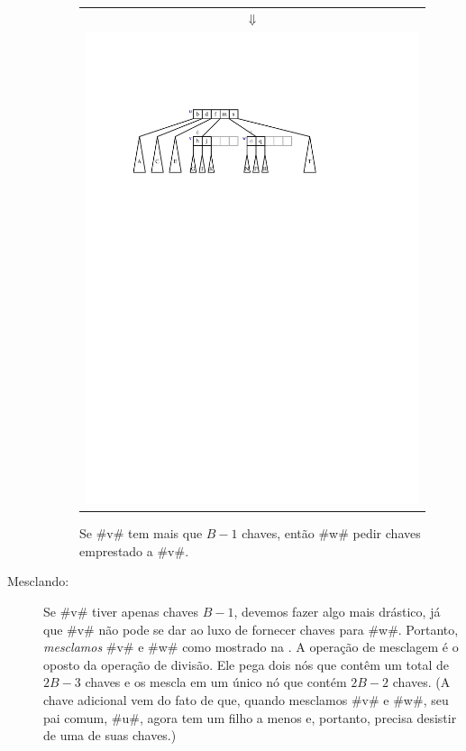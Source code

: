\begin{description}
\begin{figure}
{\begin{tabular}{@{}l@{}}
       \multicolumn{1}{c}{$\Downarrow$} \\[2ex]
       \includegraphics[width=\ScaleIfNeeded]{figs/btree-borrow-2} \\
     \end{tabular}}
    \caption[Emprestando em uma árvore de $B$]{Se #v# tem mais que $B-1$ chaves,
       então #w# pedir chaves emprestado a #v#.}
  \end{figure}
  
  \item[Mesclando:]
  Se #v# tiver apenas chaves $B-1$, devemos fazer algo mais drástico, já que #v# não pode se dar ao luxo de fornecer chaves para #w#. Portanto, \emph{mesclamos} #v# e #w# como mostrado na . A operação de mesclagem é o oposto da operação de divisão. Ele pega dois nós que contêm um total de $2B-3$ chaves e os mescla em um único nó que contém $2B-2$ chaves. (A chave adicional vem do  fato de que, quando mesclamos #v# e #w#, seu pai comum, #u#, agora tem um filho a menos e, portanto, precisa desistir de uma de suas chaves.)
  

\end{description}
